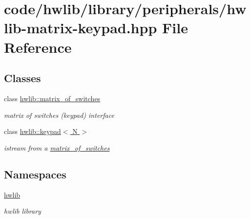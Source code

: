 \hypertarget{hwlib-matrix-keypad_8hpp}{}\section{code/hwlib/library/peripherals/hwlib-\/matrix-\/keypad.hpp File Reference}
\label{hwlib-matrix-keypad_8hpp}
\subsection*{Classes}
\begin{DoxyCompactItemize}
\item 
class \hyperlink{classhwlib_1_1matrix__of__switches}{hwlib\+::matrix\+\_\+of\+\_\+switches}
\begin{DoxyCompactList}\small\item\em matrix of switches (keypad) interface \end{DoxyCompactList}\item 
class \hyperlink{classhwlib_1_1keypad}{hwlib\+::keypad$<$ N $>$}
\begin{DoxyCompactList}\small\item\em istream from a \hyperlink{classhwlib_1_1matrix__of__switches}{matrix\+\_\+of\+\_\+switches} \end{DoxyCompactList}\end{DoxyCompactItemize}
\subsection*{Namespaces}
\begin{DoxyCompactItemize}
\item 
 \hyperlink{namespacehwlib}{hwlib}
\begin{DoxyCompactList}\small\item\em hwlib library \end{DoxyCompactList}\end{DoxyCompactItemize}
